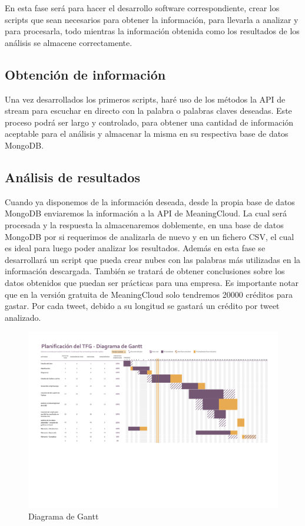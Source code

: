 En esta fase será para hacer el desarrollo software correspondiente, crear los scripts que sean necesarios para obtener la información, para llevarla a analizar y para procesarla, todo mientras la información obtenida como los resultados de los análisis se almacene correctamente. 

\subsection{Obtención de información}

Una vez desarrollados los primeros scripts, haré uso de los métodos la API de stream para escuchar en directo con la palabra o palabras claves deseadas. Este proceso podrá ser largo y controlado, para obtener una cantidad de información aceptable para el análisis y almacenar la misma en su respectiva base de datos MongoDB. 

\subsection{Análisis de resultados}

Cuando ya disponemos de la información deseada, desde la propia base de datos MongoDB enviaremos la información a la API de MeaningCloud. La cual será procesada y la respuesta la almacenaremos doblemente, en una base de datos MongoDB por si requerimos de analizarla de nuevo y en un fichero CSV, el cual es ideal para luego poder analizar los resultados. Además en esta fase se desarrollará un script que pueda crear nubes con las palabras más utilizadas en la información descargada. También se tratará de obtener conclusiones sobre los datos obtenidos que puedan ser prácticas para una empresa. 
Es importante notar que en la versión gratuita de MeaningCloud solo tendremos 20000 créditos para gastar. Por cada tweet, debido a su longitud se gastará un crédito por tweet analizado. 




%	

\begin{figure}[h]
	\centering
	\includegraphics[scale=.6]{capitulos/Gantt1.pdf}
	\caption{Diagrama de Gantt}
	\label{fig:gantt}
\end{figure}
















